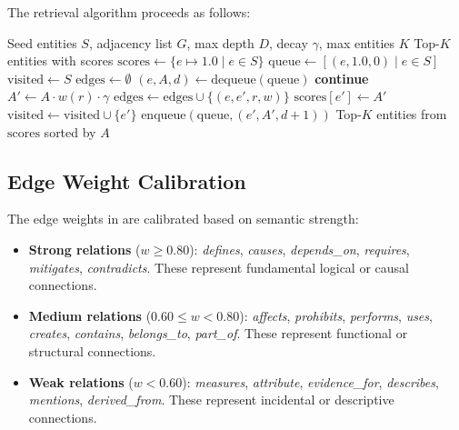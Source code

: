 \documentclass[11pt]{article}
\begin{document}
The retrieval algorithm proceeds as follows:

\begin{algorithm}[htbp]
\caption{Weighted BFS Retrieval}
\label{alg:retrieval}
\begin{algorithmic}[1]
\REQUIRE Seed entities $S$, adjacency list $G$, max depth $D$, decay $\gamma$, max entities $K$
\ENSURE Top-$K$ entities with scores
\STATE $\text{scores} \gets \{e \mapsto 1.0 \mid e \in S\}$
\STATE $\text{queue} \gets [(e, 1.0, 0) \mid e \in S]$
\STATE $\text{visited} \gets S$
\STATE $\text{edges} \gets \emptyset$
    \STATE $(e, A, d) \gets \text{dequeue}(\text{queue})$
        \STATE \textbf{continue}
    \ENDIF
        \STATE $A' \gets A \cdot w(r) \cdot \gamma$
        \STATE $\text{edges} \gets \text{edges} \cup \{(e, e', r, w)\}$
            \STATE $\text{scores}[e'] \gets A'$
        \ENDIF
            \STATE $\text{visited} \gets \text{visited} \cup \{e'\}$
            \STATE $\text{enqueue}(\text{queue}, (e', A', d+1))$
        \ENDIF
    \ENDFOR
\ENDWHILE
\RETURN Top-$K$ entities from $\text{scores}$ sorted by $A$
\end{algorithmic}
\end{algorithm}

\subsection{Edge Weight Calibration}

The edge weights in  are calibrated based on semantic strength:

\begin{itemize}
    \item \textbf{Strong relations} ($w \geq 0.80$): \textit{defines}, \textit{causes}, \textit{depends\_on}, \textit{requires}, \textit{mitigates}, \textit{contradicts}. These represent fundamental logical or causal connections.
    \item \textbf{Medium relations} ($0.60 \leq w < 0.80$): \textit{affects}, \textit{prohibits}, \textit{performs}, \textit{uses}, \textit{creates}, \textit{contains}, \textit{belongs\_to}, \textit{part\_of}. These represent functional or structural connections.
    \item \textbf{Weak relations} ($w < 0.60$): \textit{measures}, \textit{attribute}, \textit{evidence\_for}, \textit{describes}, \textit{mentions}, \textit{derived\_from}. These represent incidental or descriptive connections.
\end{itemize}
\end{document}
